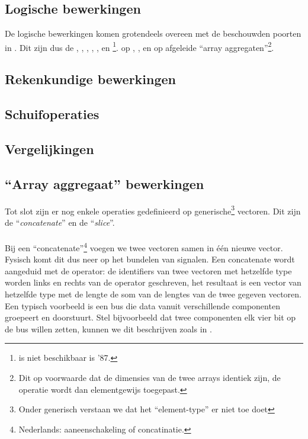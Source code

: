 \subsection{Logische bewerkingen}
De logische bewerkingen komen grotendeels overeen met de beschouwden poorten in . Dit zijn dus de , , , , ,  en \footnote{ is niet beschikbaar is \tvhdl{}'87.}.
op , ,  en op afgeleide ``array aggregaten''\footnote{Dit op voorwaarde dat de dimensies van de twee arrays identiek zijn, de operatie wordt dan elementgewijs toegepast.}.

\subsection{Rekenkundige bewerkingen}

\subsection{Schuifoperaties}

\subsection{Vergelijkingen}

\subsection{``Array aggregaat'' bewerkingen}
Tot slot zijn er nog enkele operaties gedefinieerd op generische\footnote{Onder generisch verstaan we dat het ``element-type'' er niet toe doet} vectoren. Dit zijn de ``\emph{concatenate}'' en de ``\emph{slice}''.

\paragraph{}
Bij een ``concatenate''\footnote{Nederlands: aaneenschakeling of concatinatie.} voegen we twee vectoren samen in \'e\'en nieuwe vector. Fysisch komt dit dus neer op het bundelen van signalen. Een concatenate wordt aangeduid met de \vhdltermen{\&} operator: de identifiers van twee vectoren met hetzelfde type worden links en rechts van de operator geschreven, het resultaat is een vector van hetzelfde type met de lengte de som van de lengtes van de twee gegeven vectoren. Een typisch voorbeeld is een bus die data vanuit verschillende componenten groepeert en doorstuurt. Stel bijvoorbeeld dat twee componenten elk vier bit op de bus willen zetten, kunnen we dit beschrijven zoals in .

